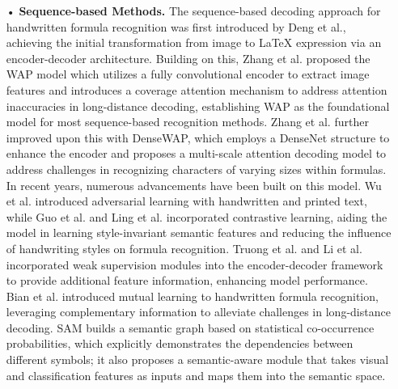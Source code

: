 \begin{itemize}
    \item [•] 
    \textbf{Sequence-based Methods.}
    The sequence-based decoding approach for handwritten formula recognition was first introduced by Deng et al.\cite{awal2014global}, achieving the initial transformation from image to LaTeX expression via an encoder-decoder architecture. Building on this, Zhang et al.\cite{zhang2017watch} proposed the WAP model which utilizes a fully convolutional encoder to extract image features and introduces a coverage attention mechanism to address attention inaccuracies in long-distance decoding, establishing WAP as the foundational model for most sequence-based recognition methods. Zhang et al.\cite{zhang2018multi} further improved upon this with DenseWAP, which employs a DenseNet structure to enhance the encoder and proposes a multi-scale attention decoding model to address challenges in recognizing characters of varying sizes within formulas. In recent years, numerous advancements\cite{zhang2017gru, zhang2018track, li2020improving, wu2019image, wu2020handwritten, guo2022primitive, lin2022cclsl, truong2020improvement, li2022counting, bian2022handwritten, liu2023semantic} have been built on this model. Wu et al.\cite{wu2019image, wu2020handwritten} introduced adversarial learning with handwritten and printed text, while Guo et al.\cite{guo2022primitive} and Ling et al.\cite{lin2022cclsl} incorporated contrastive learning, aiding the model in learning style-invariant semantic features and reducing the influence of handwriting styles on formula recognition. Truong et al.\cite{truong2020improvement} and Li et al.\cite{li2022counting} incorporated weak supervision modules into the encoder-decoder framework to provide additional feature information, enhancing model performance. Bian et al.\cite{bian2022handwritten} introduced mutual learning to handwritten formula recognition, leveraging complementary information to alleviate challenges in long-distance decoding. SAM\cite{liu2023semantic} builds a semantic graph based on statistical co-occurrence probabilities, which explicitly demonstrates the dependencies between different symbols; it also proposes a semantic-aware module that takes visual and classification features as inputs and maps them into the semantic space. 
\end{itemize}
